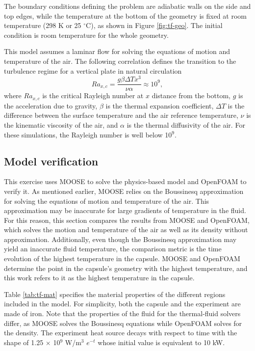 The boundary conditions defining the problem are adiabatic walls on the side and top edges, while the temperature at the bottom of the geometry is fixed at room temperature (298 K or 25 $^\circ$C), as shown in Figure \ref{fig:tf-geo}.
The initial condition is room temperature for the whole geometry.

This model assumes a laminar flow for solving the equations of motion and temperature of the air.
The following correlation defines the transition to the turbulence regime for a vertical plate in natural circulation \cite{incropera_fundamentals_2006}
\begin{equation}
Ra_{x,c} = \frac{g \beta \Delta T x^3}{\nu \alpha} \approx 10^9,
\end{equation}
where $Ra_{x,c}$ is the critical Rayleigh number at $x$ distance from the bottom, $g$ is the acceleration due to gravity, $\beta$ is the thermal expansion coefficient, $\Delta T$ is the difference between the surface temperature and the air reference temperature, $\nu$ is the kinematic viscosity of the air, and $\alpha$ is the thermal diffusivity of the air.
For these simulations, the Rayleigh number is well below 10$^9$.


\subsection{Model verification}

This exercise uses MOOSE to solve the physics-based model and OpenFOAM to verify it.
As mentioned earlier, MOOSE relies on the Boussinesq approximation for solving the equations of motion and temperature of the air.
This approximation may be inaccurate for large gradients of temperature in the fluid.
For this reason, this section compares the results from MOOSE and OpenFOAM, which solves the motion and temperature of the air as well as its density without approximation.
Additionally, even though the Boussinesq approximation may yield an inaccurate fluid temperature, the comparison metric is the time evolution of the highest temperature in the capsule.
MOOSE and OpenFOAM determine the point in the capsule's geometry with the highest temperature, and this work refers to it as the highest temperature in the capsule.

Table \ref{tab:tf-mat} specifies the material properties of the different regions included in the model.
For simplicity, both the capsule and the experiment are made of iron.
Note that the properties of the fluid for the thermal-fluid solvers differ, as MOOSE solves the Boussinesq equations while OpenFOAM solves for the density.
The experiment heat source decays with respect to time with the shape of 1.25 $\times$ 10$^9$ W/m$^3$ $e^{-t}$ whose initial value is equivalent to 10 kW.

